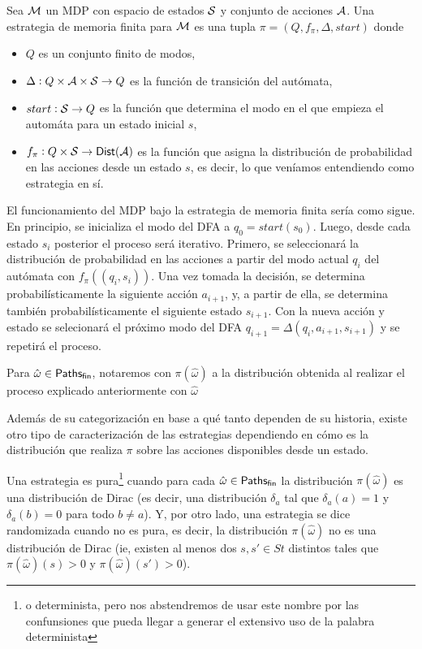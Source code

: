 \begin{definition}
	Sea $\mathcal{M}$ un MDP con espacio de estados $\mathcal{S}$ y conjunto de acciones $\mathcal{A}$. Una estrategia de memoria finita para $\mathcal{M}$ es una tupla $\pi = (Q, f_\pi, \Delta, start)$ donde
	\begin{itemize}
		\item $Q$ es un conjunto finito de modos,
		\item $\Delta : Q \times \mathcal{A} \times \mathcal{S} \rightarrow Q$ es la función de transición del autómata,
		\item $start: \mathcal{S} \rightarrow Q$ es la función que determina el modo en el que empieza el automáta para un estado inicial $s$,
		\item $f_\pi : Q \times \mathcal{S} \rightarrow \mathsf{Dist}(\mathcal{A})$ es la función que asigna la distribución de probabilidad en las acciones desde un estado $s$, es decir, lo que veníamos entendiendo como estrategia en sí.
	\end{itemize}
	El funcionamiento del MDP bajo la estrategia de memoria finita sería como sigue. En principio, se inicializa el modo del DFA a $q_0 = start(s_0)$. Luego, desde cada estado $s_i$ posterior el proceso será iterativo. Primero, se seleccionará la distribución de probabilidad en las acciones a partir del modo actual $q_i$ del autómata con $f_\pi((q_i,s_i))$. Una vez tomada la decisión, se determina probabilísticamente la siguiente acción $a_{i+1}$, y, a partir de ella, se determina también probabilísticamente el siguiente estado $s_{i+1}$. Con la nueva acción y estado se selecionará el próximo modo del DFA $q_{i+1} = \Delta(q_i, a_{i+1}, s_{i+1})$ y se repetirá el proceso.

	Para $\hat \omega \in \textsf{Paths}_\textsf{fin}$, notaremos con $\pi(\hat \omega)$ a la
	distribución obtenida al realizar el proceso explicado anteriormente con $\hat
		\omega$
\end{definition}

Además de su categorización en base a qué tanto dependen de su historia, existe
otro tipo de caracterización de las estrategias dependiendo en cómo es la
distribución que realiza $\pi$ sobre las acciones disponibles desde un estado.

Una estrategia es pura\footnote{o determinista, pero nos abstendremos de usar
	este nombre por las confunsiones que pueda llegar a generar el extensivo uso de
	la palabra determinista} cuando para cada $\hat \omega \in \textsf{Paths}_\textsf{fin}$ la
distribución $\pi(\hat \omega)$ es una distribución de Dirac (es decir, una
distribución $\delta_a$ tal que $\delta_a(a) = 1$ y $\delta_a(b) = 0$ para todo
$b \neq a$). Y, por otro lado, una estrategia se dice randomizada cuando no es
pura, es decir, la distribución $\pi(\hat \omega)$ no es una distribución de
Dirac (ie, existen al menos dos $s, s' \in St$ distintos tales que $\pi(\hat
	\omega)(s) > 0$ y $\pi(\hat \omega)(s') > 0$).

